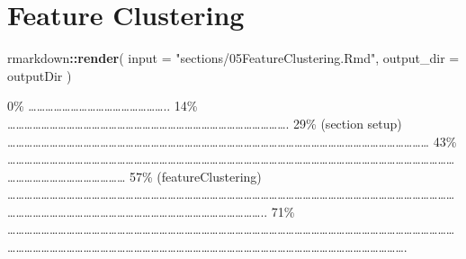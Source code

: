\documentclass[
]{article}
\newenvironment{Shaded}{\begin{snugshade}}{\end{snugshade}}
\newcommand{\AttributeTok}[1]{\textcolor[rgb]{0.13,0.29,0.53}{#1}}
\newcommand{\FunctionTok}[1]{\textcolor[rgb]{0.13,0.29,0.53}{\textbf{#1}}}
\newcommand{\NormalTok}[1]{#1}
\newcommand{\SpecialCharTok}[1]{\textcolor[rgb]{0.81,0.36,0.00}{\textbf{#1}}}
\newcommand{\StringTok}[1]{\textcolor[rgb]{0.31,0.60,0.02}{#1}}
\begin{document}
\hypertarget{feature-clustering}{%
\section{Feature Clustering}\label{feature-clustering}}

\begin{Shaded}
\begin{Highlighting}[]
\NormalTok{rmarkdown}\SpecialCharTok{::}\FunctionTok{render}\NormalTok{(}
  \AttributeTok{input =} \StringTok{"sections/05FeatureClustering.Rmd"}\NormalTok{,}
  \AttributeTok{output\_dir =}\NormalTok{ outputDir}
\NormalTok{)}
\end{Highlighting}
\end{Shaded}

\textbar{} \textbar{} \textbar{} 0\% \textbar{}
\textbar\ldots\ldots\ldots\ldots\ldots\ldots\ldots\ldots\ldots\ldots\ldots\ldots\ldots\ldots\ldots\ldots..
\textbar{} 14\% \textbar{}
\textbar\ldots\ldots\ldots\ldots\ldots\ldots\ldots\ldots\ldots\ldots\ldots\ldots\ldots\ldots\ldots\ldots\ldots\ldots\ldots\ldots\ldots\ldots\ldots\ldots\ldots\ldots\ldots\ldots\ldots\ldots\ldots\ldots\ldots.
\textbar{} 29\% (section setup) \textbar{}
\textbar\ldots\ldots\ldots\ldots\ldots\ldots\ldots\ldots\ldots\ldots\ldots\ldots\ldots\ldots\ldots\ldots\ldots\ldots\ldots\ldots\ldots\ldots\ldots\ldots\ldots\ldots\ldots\ldots\ldots\ldots\ldots\ldots\ldots\ldots\ldots\ldots\ldots\ldots\ldots\ldots\ldots\ldots\ldots\ldots\ldots\ldots\ldots\ldots\ldots\ldots{}
\textbar{} 43\% \textbar{}
\textbar\ldots\ldots\ldots\ldots\ldots\ldots\ldots\ldots\ldots\ldots\ldots\ldots\ldots\ldots\ldots\ldots\ldots\ldots\ldots\ldots\ldots\ldots\ldots\ldots\ldots\ldots\ldots\ldots\ldots\ldots\ldots\ldots\ldots\ldots\ldots\ldots\ldots\ldots\ldots\ldots\ldots\ldots\ldots\ldots\ldots\ldots\ldots\ldots\ldots\ldots\ldots\ldots\ldots\ldots\ldots\ldots\ldots\ldots\ldots\ldots\ldots\ldots\ldots\ldots\ldots\ldots\ldots{}
\textbar{} 57\% (featureClustering) \textbar{}
\textbar\ldots\ldots\ldots\ldots\ldots\ldots\ldots\ldots\ldots\ldots\ldots\ldots\ldots\ldots\ldots\ldots\ldots\ldots\ldots\ldots\ldots\ldots\ldots\ldots\ldots\ldots\ldots\ldots\ldots\ldots\ldots\ldots\ldots\ldots\ldots\ldots\ldots\ldots\ldots\ldots\ldots\ldots\ldots\ldots\ldots\ldots\ldots\ldots\ldots\ldots\ldots\ldots\ldots\ldots\ldots\ldots\ldots\ldots\ldots\ldots\ldots\ldots\ldots\ldots\ldots\ldots\ldots\ldots\ldots\ldots\ldots\ldots\ldots\ldots\ldots\ldots\ldots\ldots\ldots\ldots\ldots\ldots\ldots..
\textbar{} 71\% \textbar{}
\textbar\ldots\ldots\ldots\ldots\ldots\ldots\ldots\ldots\ldots\ldots\ldots\ldots\ldots\ldots\ldots\ldots\ldots\ldots\ldots\ldots\ldots\ldots\ldots\ldots\ldots\ldots\ldots\ldots\ldots\ldots\ldots\ldots\ldots\ldots\ldots\ldots\ldots\ldots\ldots\ldots\ldots\ldots\ldots\ldots\ldots\ldots\ldots\ldots\ldots\ldots\ldots\ldots\ldots\ldots\ldots\ldots\ldots\ldots\ldots\ldots\ldots\ldots\ldots\ldots\ldots\ldots\ldots\ldots\ldots\ldots\ldots\ldots\ldots\ldots\ldots\ldots\ldots\ldots\ldots\ldots\ldots\ldots\ldots\ldots\ldots\ldots\ldots\ldots\ldots\ldots\ldots\ldots\ldots\ldots\ldots\ldots\ldots\ldots\ldots\ldots.
\end{document}

